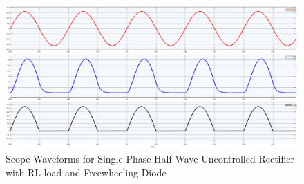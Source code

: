 \begin{figure}[h]
    \centering
    \includegraphics[width=1\textwidth]{images/experiment-1/circuit-scope-simulation-03.png}
    \caption{Scope Waveforms for Single Phase Half Wave Uncontrolled Rectifier with RL load and Freewheeling Diode}
    \label{Fig_waveform_single-phase-half-wave-uncontrolled-rectifier-with-RL-load-and-freewheeling-diode}
\end{figure}


\pagebreak

